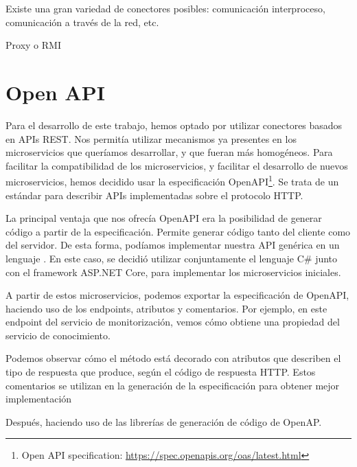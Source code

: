 Existe una gran variedad de conectores posibles: comunicación interproceso, comunicación a través de la red, etc.

Proxy o RMI

\section{Open API}

Para el desarrollo de este trabajo, hemos optado por utilizar conectores basados en APIs REST. Nos permitía utilizar mecanismos ya presentes en los microservicios que queríamos desarrollar, y que fueran más homogéneos. 
Para facilitar la compatibilidad de los microservicios, y facilitar el desarrollo de nuevos microservicios, hemos decidido usar la especificación OpenAPI\footnote{Open API specification: \url{https://spec.openapis.org/oas/latest.html}}. Se trata de un estándar para describir APIs implementadas sobre el protocolo HTTP. 

La principal ventaja que nos ofrecía OpenAPI era la posibilidad de generar código a partir de la especificación. Permite generar código tanto del cliente como del servidor. De esta forma, podíamos implementar nuestra API genérica en un lenguaje . En este caso, se decidió utilizar conjuntamente el lenguaje C\# junto con el framework ASP.NET Core, para implementar los microservicios iniciales.

A partir de estos microservicios, podemos exportar la especificación de OpenAPI, haciendo uso de los endpoints, atributos y comentarios. Por ejemplo, en este endpoint del servicio de monitorización, vemos cómo obtiene una propiedad del servicio de conocimiento.

Podemos observar cómo el método está decorado con atributos que describen el tipo de respuesta que produce, según el código de respuesta HTTP. Estos comentarios se utilizan en la generación de la especificación para obtener mejor implementación

Después, haciendo uso de las librerías de generación de código de OpenAP.